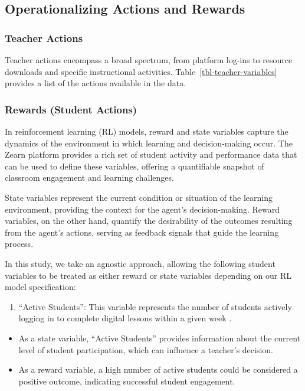 \documentclass[
  number,
  preprint,
  3p,
  onecolumn]{elsarticle}
\providecommand{\tightlist}{%
  \setlength{\itemsep}{0pt}\setlength{\parskip}{0pt}}\usepackage{longtable,booktabs,array}
\begin{document}
\subsection{Operationalizing Actions and
Rewards}\label{operationalizing-actions-and-rewards}

\subsubsection{Teacher Actions}\label{teacher-actions}

Teacher actions encompass a broad spectrum, from platform log-ins to
resource downloads and specific instructional activities.
Table~\ref{tbl-teacher-variables} provides a list of the actions
available in the data.

\subsubsection{Rewards (Student Actions)}\label{rewards-student-actions}

In reinforcement learning (RL) models, reward and state variables
capture the dynamics of the environment in which learning and
decision-making occur. The Zearn platform provides a rich set of student
activity and performance data that can be used to define these
variables, offering a quantifiable snapshot of classroom engagement and
learning challenges.

State variables represent the current condition or situation of the
learning environment, providing the context for the agent's
decision-making. Reward variables, on the other hand, quantify the
desirability of the outcomes resulting from the agent's actions, serving
as feedback signals that guide the learning process.

In this study, we take an agnostic approach, allowing the following
student variables to be treated as either reward or state variables
depending on our RL model specification:

\begin{enumerate}
\def\labelenumi{\arabic{enumi}.}
\tightlist
\item
  ``Active Students'': This variable represents the number of students
  actively logging in to complete digital lessons within a given week
  \citep{zearn2022}.
\end{enumerate}

\begin{itemize}
\tightlist
\item
  As a state variable, ``Active Students'' provides information about
  the current level of student participation, which can influence a
  teacher's decision.
\item
  As a reward variable, a high number of active students could be
  considered a positive outcome, indicating successful student
  engagement.
\end{itemize}
\end{document}
